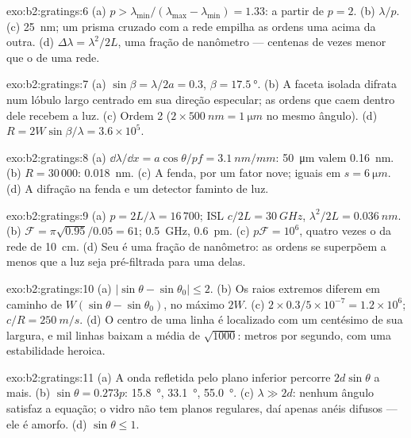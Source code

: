 \begin{solution}{exo:b2:gratings:6}
(a) $p > \lambda_{\min}/(\lambda_{\max} - \lambda_{\min}) = 1.33$: a partir de $p = 2$. (b) $\lambda/p$. (c)
\qty{25}{nm}; um prisma cruzado com a rede empilha as ordens uma acima
da outra. (d) $\Delta\lambda = \lambda^2/2L$, uma fração de nanômetro --- centenas
de vezes menor que o de uma rede.
\end{solution}

\begin{solution}{exo:b2:gratings:7}
(a) $\sin\beta = \lambda/2a = 0.3$, $\beta = \qty{17.5}{\degree}$. (b) A faceta isolada difrata
num lóbulo largo centrado em sua direção especular; as ordens que
caem dentro dele recebem a luz. (c) Ordem 2 ($2 \times \qty{500}{nm} = \qty{1}{\micro m}$ no
mesmo ângulo). (d) $R = 2W\sin\beta/\lambda = 3.6 \times 10^5$.
\end{solution}

\begin{solution}{exo:b2:gratings:8}
(a) $\dd\lambda/\dd x = a\cos\theta/pf = \qty{3.1}{nm/mm}$: \qty{50}{\micro m} valem \qty{0.16}{nm}. (b)
$R = 30\,000$: \qty{0.018}{nm}. (c) A fenda, por um fator nove; iguais em $s = \qty{6}{\micro m}$.
(d) A difração na fenda e um detector faminto de luz.
\end{solution}

\begin{solution}{exo:b2:gratings:9}
(a) $p = 2L/\lambda = 16\,700$; ISL $c/2L = \qty{30}{GHz}$, $\lambda^2/2L = \qty{0.036}{nm}$. (b) $\mathcal F
= \pi\sqrt{0.95}/0.05 = 61$; \qty{0.5}{GHz}, \qty{0.6}{pm}. (c) $p\mathcal F = 10^6$, quatro
vezes o da rede de \qty{10}{cm}. (d) Seu  é uma fração
de nanômetro: as ordens se superpõem a menos que a luz seja pré-filtrada
para uma delas.
\end{solution}

\begin{solution}{exo:b2:gratings:10}
(a) $|\sin\theta - \sin\theta_0| \le 2$. (b) Os raios extremos diferem em caminho de
$W(\sin\theta - \sin\theta_0)$, no máximo $2W$. (c) $2 \times 0.3/5 \times 10^{-7} = 1.2 \times 10^6$; $c/R
= \qty{250}{m/s}$. (d) O centro de uma linha é localizado com um centésimo de sua
largura, e mil linhas baixam a média de $\sqrt{1000}$: metros por
segundo, com uma estabilidade heroica.
\end{solution}

\begin{solution}{exo:b2:gratings:11}
(a) A onda refletida pelo plano inferior percorre $2d\sin\theta$ a mais.
(b) $\sin\theta = 0.273p$: \qty{15.8}{\degree}, \qty{33.1}{\degree}, \qty{55.0}{\degree}. (c) $\lambda \gg 2d$:
nenhum ângulo satisfaz a equação; o vidro não tem planos regulares, daí
apenas anéis difusos --- ele é amorfo. (d) $\sin\theta \le 1$.
\end{solution}

